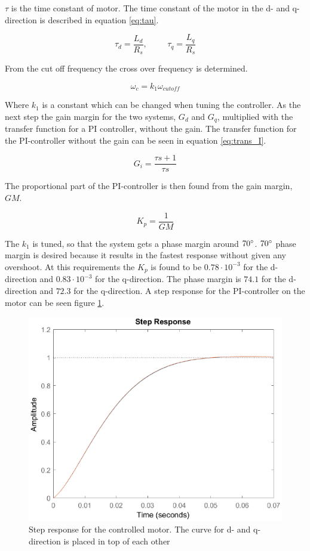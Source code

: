 $\tau$ is the time constant of motor. The time constant of the motor in the d- and q-direction is described in equation \ref{eq:tau}.

\begin{equation}
    \label{eq:tau}
    \tau_d = \frac{L_d}{R_s}
    , \hspace{1cm}
    \tau_q = \frac{L_q}{R_s}
\end{equation}

From the cut off frequency the cross over frequency is determined.

\begin{equation}
    \label{eq:crossover}
     \omega_c = k_1 \omega_{cutoff}
\end{equation}

Where $k_1$ is a constant which can be changed when tuning the controller.
As the next step the gain margin for the two systems, $G_d$ and $G_q$, multiplied with the transfer function for a PI controller, without the gain. The transfer function for the PI-controller without the gain can be seen in equation \ref{eq:trans_I}.

\begin{equation}
    \label{eq:trans_I}
    G_i = \frac{\tau s + 1}{\tau s}
\end{equation}

The proportional part of the PI-controller is then found from the gain margin, $GM$.

\begin{equation}
    \label{eq:gain}
    K_p = \frac{1}{GM} 
\end{equation}

The $k_1$ is tuned, so that the system gets a phase margin around $70 \degree$. $70 \degree$ phase margin is desired because it results in the fastest response without given any overshoot. At this requirements the $K_p$ is found to be $0.78 \cdot 10^{-3}$ for the d-direction and $0.83 \cdot 10^{-3}$ for the q-direction. The phase margin is $74.1$ for the d-direction and $72.3$ for the q-direction.
A step response for the PI-controller on the motor can be seen figure \ref{fig:step}.

\begin{figure}[H]
	\centering
	\includegraphics[width=0.6\linewidth]{pictures/control/step_PI.eps}
	\caption{Step response for the controlled motor. The curve for d- and q-direction is placed in top of each other}
	\label{fig:step}
\end{figure}





